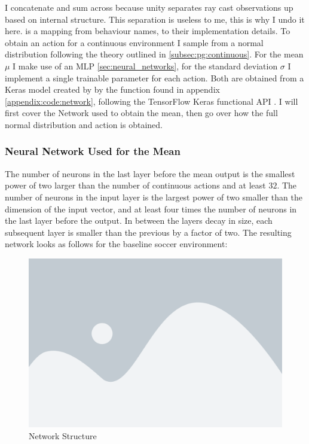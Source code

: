 \noindent
I concatenate and sum across  because unity separates ray cast observations up based on internal structure. This separation is useless to me, this is why I undo it here.  is a mapping from behaviour names, to their implementation details. To obtain an action for a continuous environment I sample from a normal distribution following the theory outlined in \ref{subsec:pg:continuous}. For the mean $\mu$ I make use of an MLP \ref{sec:neural_networks}, for the standard deviation $\sigma$ I implement a single trainable parameter for each action. Both are obtained from a Keras model created by by the function found in appendix \ref{appendix:code:network}, following the TensorFlow Keras functional API \cite{noauthor_tensorflow_nodate}\cite{chollet2015keras}. I will first cover the Network used to obtain the mean, then go over how the full normal distribution and action is obtained.

\subsubsection{Neural Network Used for the Mean}\label{subsubsec:ip:agent:policy:mean}
The number of neurons in the last layer before the mean output is the smallest power of two larger than the number of continuous actions and at least $32$. The number of neurons in the input layer is the largest power of two smaller than the dimension of the input vector, and at least four times the number of neurons in the last layer before the output. In between the layers decay in size, each subsequent layer is smaller than the previous by a factor of two. The resulting network looks as follows for the baseline soccer environment:

\begin{figure}[H]
    \centering
    \includegraphics[width=0.5\linewidth]{figures/placeholder.png}
    \caption{Network Structure}
    \label{fig:network_repr}
\end{figure}

